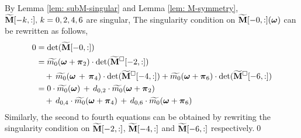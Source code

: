 By Lemma \ref{lem: subM-singular} and Lemma \ref{lem: M-symmetry},  $\widetilde{\mathbf{M}}[-k,:],\,k=0,2,4,6$ are singular,
The singularity condition on  $\widetilde{\mathbf{M}}[-0,:](\boldsymbol{\omega})$ can be rewritten as follows,
\begin{align}\label{eq: singular-omega}
0 &=\det(\widetilde{\mathbf{M}}[-0,:]) \notag\\
&=  \widetilde{m_0}(\boldsymbol{\omega}+\boldsymbol{\pi}_2)\cdot\det(\widetilde{\mathbf{M}}^{\Box}[-2,:])\notag\\
&\quad+ \,\widetilde{m_0}(\boldsymbol{\omega}\,+\,\boldsymbol{\pi}_4)\cdot\det(\widetilde{\mathbf{M}}^{\Box}[-4,:])
+ \widetilde{m_0}(\boldsymbol{\omega}+\boldsymbol{\pi}_6)\cdot\det(\widetilde{\mathbf{M}}^{\Box}[-6,:])\notag\\
&= 0\cdot\widetilde{m_0}(\boldsymbol{\omega})\,+\,d_{0,2}\cdot\widetilde{m_0}(\boldsymbol{\omega}+\boldsymbol{\pi}_2) \notag\\
&\quad+\,d_{0,4}\cdot \widetilde{m_0}(\boldsymbol{\omega} + \boldsymbol{\pi}_4)\,+\, d_{0,6}\cdot\widetilde{m_0}(\boldsymbol{\omega} + \boldsymbol{\pi}_6) 
\end{align}
Similarly, the second to fourth equations can be obtained by rewriting the singularity condition on $\widetilde{\mathbf{M}}[-2,:]$, $\widetilde{\mathbf{M}}[-4,:]$ and $\widetilde{\mathbf{M}}[-6,:]$ respectively.\qed

